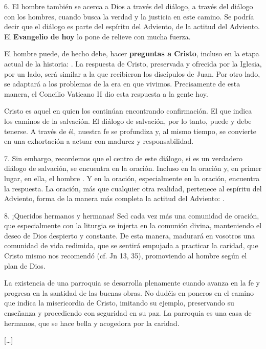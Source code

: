 \begin{body}
\begin{body}
6. El hombre también se acerca a Dios a través del diálogo, a través del diálogo con los hombres, cuando busca la verdad y la justicia en este camino. Se podría decir que el diálogo es parte del espíritu del Adviento, de la actitud del Adviento. El \textbf{Evangelio de hoy} lo pone de relieve con mucha fuerza.

El hombre puede, de hecho debe, hacer \textbf{preguntas a Cristo}, incluso en la etapa actual de la historia: . La respuesta de Cristo, preservada y ofrecida por la Iglesia, por un lado, será similar a la que recibieron los discípulos de Juan. Por otro lado, se adaptará a los problemas de la era en que vivimos. Precisamente de esta manera, el Concilio Vaticano II dio esta respuesta a la gente hoy.

Cristo es aquel en quien los  continúan encontrando confirmación. El que indica los caminos de la salvación. El diálogo de salvación, por lo tanto, puede y debe tenerse. A través de él, nuestra fe se profundiza y, al mismo tiempo, se convierte en una exhortación a actuar con madurez y responsabilidad.

7. Sin embargo, recordemos que el centro de este diálogo, si es un verdadero diálogo de salvación, se encuentra en la oración. Incluso en la oración y, en primer lugar, en ella, el hombre . Y en la oración, especialmente en la oración, encuentra la respuesta. La oración, más que cualquier otra realidad, pertenece al espíritu del Adviento, forma de la manera más completa la actitud del Adviento: .

8. ¡Queridos hermanos y hermanas! Sed cada vez más una comunidad de oración, que especialmente con la liturgia se injerta en la comunión divina, manteniendo el deseo de Dios despierto y constante. De esta manera, madurará en vosotros una comunidad de vida redimida, que se sentirá empujada a practicar la caridad, que Cristo mismo nos recomendó (cf. Jn 13, 35), promoviendo al hombre según el plan de Dios.

La existencia de una parroquia se desarrolla plenamente cuando avanza en la fe y progresa en la santidad de las buenas obras. No dudéis en poneros en el camino que indica la misericordia de Cristo, imitando su ejemplo, preservando su enseñanza y procediendo con seguridad en su paz. La parroquia es una casa de hermanos, que se hace bella y acogedora por la caridad.

[\ldots{}]


\end{body}
\end{body}
